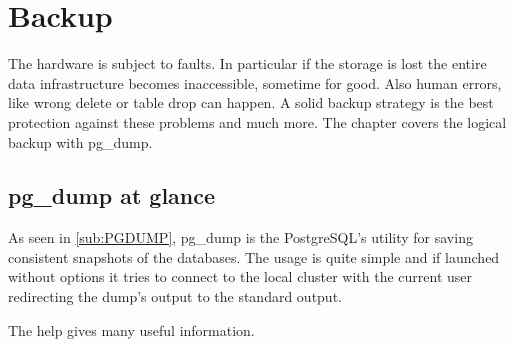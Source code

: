 \chapter{Backup}
\label{cha:BACKUP}
The hardware is subject to faults. In particular if the storage is lost the entire data
infrastructure becomes inaccessible, sometime for good. Also human errors, like wrong delete or table drop
can happen. A solid backup strategy is the best protection against these problems and much more. The
chapter covers the logical backup with pg\_dump.

\section{pg\_dump at glance}
\label{sec:PGDUMP}
As seen in \ref{sub:PGDUMP}, pg\_dump is the PostgreSQL's utility for saving
consistent snapshots of the databases. The usage is quite simple and if launched without options it tries
to connect to the local cluster with the current user redirecting the dump's output to the standard
output.\newline

The help gives many useful information.

